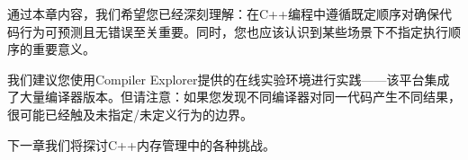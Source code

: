 通过本章内容，我们希望您已经深刻理解：在C++编程中遵循既定顺序对确保代码行为可预测且无错误至关重要。同时，您也应该认识到某些场景下不指定执行顺序的重要意义。

我们建议您使用Compiler Explorer提供的在线实验环境进行实践——该平台集成了大量编译器版本。但请注意：如果您发现不同编译器对同一代码产生不同结果，很可能已经触及未指定/未定义行为的边界。

下一章我们将探讨C++内存管理中的各种挑战。